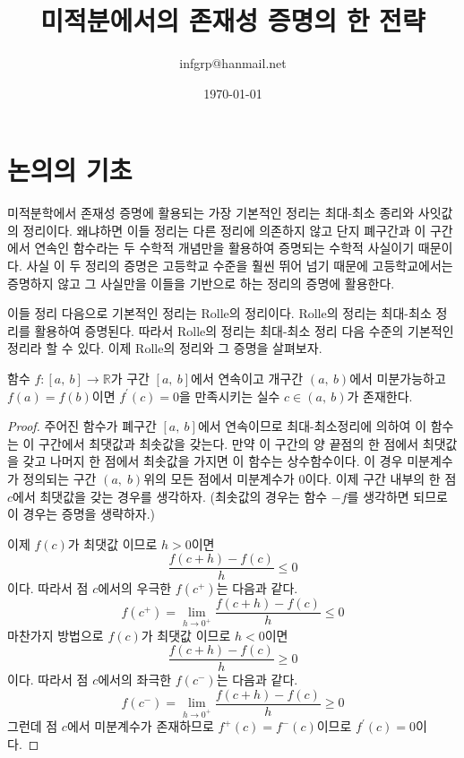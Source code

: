 \documentclass[a4paper]{article}
\title{미적분에서의 존재성 증명의 한 전략}
\author{infgrp@hanmail.net}
\date{\today}
\begin{document}
\maketitle



\section{논의의 기초}

    미적분학에서 존재성 증명에 활용되는 가장 기본적인 정리는 최대-최소 종리와 사잇값의 정리이다. 왜냐하면 이들 정리는 다른 정리에 의존하지 않고 단지 폐구간과 이 구간에서 연속인 함수라는 두 수학적 개념만을 활용하여 증명되는 수학적 사실이기 때문이다. 사실 이 두 정리의 증명은 고등학교 수준을 훨씬 뛰어 넘기 때문에 고등학교에서는 증명하지 않고 그 사실만을 이들을 기반으로 하는 정리의 증명에 활용한다. 
    
    이들 정리 다음으로 기본적인 정리는 Rolle의 정리이다. Rolle의 정리는 최대-최소 정리를 활용하여 증명된다. 따라서 Rolle의 정리는 최대-최소 정리 다음 수준의 기본적인 정리라 할 수 있다. 이제 Rolle의 정리와 그 증명을 살펴보자. 
\vspace{1em}
\begin{theorem}[Rolle의 정리]
함수 $f:[a,\: b]\to\mathbb{R}$가 구간 $[a,\: b]$에서 연속이고 개구간 $(a,\: b)$에서 미분가능하고
 $f(a)=f(b)$이면 $f^{\prime}(c)=0$을 만족시키는 실수 $c \in(a,\: b)$가 존재한다.
\begin{proof}
 주어진 함수가 폐구간 $[a,\: b]$에서 연속이므로 최대-최소정리에 의하여 이 함수는 이 구간에서 최댓값과 최솟값을 갖는다. 만약 이 구간의 양 끝점의 한 점에서 최댓값을 갖고 나머지 한 점에서 최솟값을 가지면 이 함수는 상수함수이다. 이 경우 미분계수가 정의되는 구간 $(a, \;b)$위의 모든 점에서 미분계수가 $0$이다. 이제 구간 내부의 한 점 $c$에서 최댓값을 갖는 경우를 생각하자. (최솟값의 경우는 함수 $-f$를 생각하면 되므로 이 경우는 증명을 생략하자.) 

이제 $f(c)$가 최댓값 이므로  $h>0$이면 
\[
\frac{f(c+h)-f(c)}{h} \le 0
\]
이다. 따라서 점 $c$에서의 우극한 $f(c^{+})$는 다음과 같다.
\[
f(c^{+}) = \lim\limits_{h \to 0^{+}} \frac{f(c+h)-f(c)}{h} \le 0
\]
마찬가지 방법으로 $f(c)$가 최댓값 이므로  $h<0$이면 
\[
\frac{f(c+h)-f(c)}{h} \ge 0
\]
이다. 따라서 점 $c$에서의 좌극한 $f(c^{-})$는 다음과 같다.
\[
f(c^{-}) = \lim\limits_{h \to 0^{+}} \frac{f(c+h)-f(c)}{h} \ge 0
\]
그런데 점 $c$에서 미분계수가 존재하므로 $f^{+}(c)= f^{-}(c)$이므로 $f^{\prime}(c)=0$이다.
\end{proof}
\end{theorem}
\vspace{1em}
\end{document}
